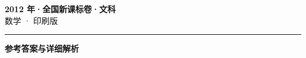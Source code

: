 \documentclass[zihao=5, a4paper]{ctexart}
\begin{document}
\begin{center}
  {\Large\bfseries 2012 年·全国新课标卷·文科}\\[4pt]
  {\large 数学 · 印刷版}
\end{center}
\medskip
{}

\par\bigskip\hrule\bigskip
{}
\begin{center}{\large\bfseries 参考答案与详细解析}\end{center}
\smallskip

\end{document}
